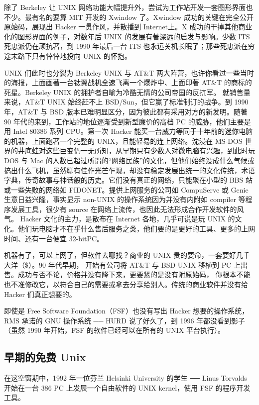 除了 Berkeley 让 UNIX 网络功能大幅提升外，尝试为工作站开发一套图形界面也不少。最有名的要算 MIT 开发的 Xwindow 了。Xwindow 成功的关键在完全公开原始码，展现出 Hacker 一贯作风，并散播到 Internet上。X 成功的干掉其他商业化的图形界面的例子，对数年后 UNIX 的发展有著深远的启发与影响。少数 ITS 死忠派仍在顽抗著，到 1990 年最后一台 ITS 也永远关机长眠了；那些死忠派在穷途末路下只有悻悻地投向 UNIX 的怀抱。

UNIX 们此时也分裂为 Berkeley UNIX 与 AT\&T 两大阵营，也许你看过一些当时的海报，上面画著一台钛翼战机全速飞离一个爆炸中、上面印著 AT\&T 的商标的死星。Berkeley UNIX 的拥护者自喻为冷酷无情的公司帝国的反抗军。 就销售量来说，AT\&T UNIX 始终赶不上 BSD/Sun，但它赢了标准制订的战争。到 1990 年，AT\&T 与 BSD 版本已难明显区分，因为彼此都有采用对方的新发明。随著 90 年代的来到，工作站的地位逐渐受到新型廉价的高档 PC 的威胁，他们主要是用 Intel 80386 系列 CPU。第一次 Hacker 能买一台威力等同于十年前的迷你电脑的机器，上面跑著一个完整的 UNIX，且能轻易的连上网络。沈浸在 MS-DOS 世界的井底蛙对这些巨变仍一无所知，从早期只有少数人对微电脑有兴趣，到此时玩 DOS 与 Mac 的人数已超过所谓的“网络民族”的文化，但他们始终没成什么气候或搞出什么飞机，虽然聊有佳作光芒乍现，却没有稳定发展出统一的文化传统，术语字典，传奇故事与神话般的历史。它们没有真正的网络，只能聚在小型的 BBS 站或一些失败的网络如 FIDONET。提供上网服务的公司如 CompuServe 或 Genie 生意日益兴隆，事实显示 non-UNIX 的操作系统因为并没有内附如 compiler 等程序发展工具，很少有 source 在网络上流传，也因此无法形成合作开发软件的风气。 Hacker 文化的主力，是散布在 Internet 各地，几乎可说是玩 UNIX 的文化。他们玩电脑才不在乎什么售后服务之类，他们要的是更好的工具、更多的上网时间、还有一台便宜 32-bitPC。

机器有了，可以上网了，但软件去哪找？商业的 UNIX 贵的要命，一套要好几千大洋（\$）。90 年代早期， 开始有公司将 AT\&T 与 BSD UNIX 移植到 PC 上出售。成功与否不论，价格并没有降下来，更要紧的是没有附原始码， 你根本不能也不准修改它，以符合自己的需要或拿去分享给别人。传统的商业软件并没有给 Hacker 们真正想要的。

即使是 Free Software Foundation（FSF）也没有写出 Hacker 想要的操作系统，RMS 承诺的 GNU 操作系统 ── HURD 说了好久了，到 1996 年都没看到影子（虽然 1990 年开始，FSF 的软件已经可以在所有的 UNIX 平台执行）。

\subsection{早期的免费 Unix}

在这空窗期中，1992 年一位芬兰 Helsinki University 的学生 ── Linus Torvalds 开始在一台 386 PC 上发展一个自由软件的 UNIX kernel，使用 FSF 的程序开发工具。

